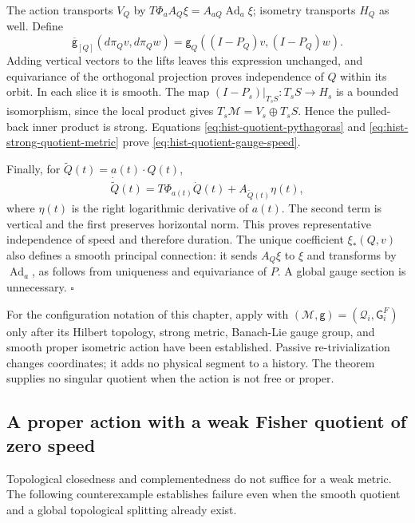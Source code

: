 The action transports \(V_Q\) by
\(T\Phi_a A_Q\xi=A_{aQ}\operatorname{Ad}_a\xi\); isometry transports
\(H_Q\) as well. Define
\begin{equation}
\overline{\mathsf g}_{[Q]}(d\pi_Qv,d\pi_Qw)
=\mathsf g_Q((I-P_Q)v,(I-P_Q)w).
\label{eq:hist-strong-quotient-metric}
\end{equation}
Adding vertical vectors to the lifts leaves this expression unchanged,
and equivariance of the orthogonal projection proves independence of \(Q\)
within its orbit. In each slice it is smooth. The map
\((I-P_s)|_{T_sS}:T_sS\to H_s\) is a bounded isomorphism, since the local
product gives \(T_s\mathcal M=V_s\oplus T_sS\). Hence the pulled-back inner
product is strong. Equations \eqref{eq:hist-quotient-pythagoras}
and \eqref{eq:hist-strong-quotient-metric} prove
\eqref{eq:hist-quotient-gauge-speed}.

Finally, for \(\widetilde Q(t)=a(t)\cdot Q(t)\),
\begin{equation}
\dot{\widetilde Q}(t)
=T\Phi_{a(t)}\dot Q(t)+A_{\widetilde Q(t)}\eta(t),
\label{eq:hist-moving-quotient-representative}
\end{equation}
where \(\eta(t)\) is the right logarithmic derivative of \(a(t)\).
The second term is vertical and the first preserves horizontal norm.
This proves representative independence of speed and therefore duration.
The unique coefficient \(\xi_*(Q,v)\) also defines a smooth principal
connection: it sends \(A_Q\xi\) to \(\xi\) and transforms by
\(\operatorname{Ad}_a\), as follows from uniqueness and equivariance of
\(P\). A global gauge section is unnecessary. \(\square\)

For the configuration notation of this chapter, apply
 with
\((\mathcal M,\mathsf g)=(\mathcal Q_i,\mathsf G_i^F)\) only after its
Hilbert topology, strong metric, Banach-Lie gauge group, and smooth proper
isometric action have been established. Passive re-trivialization changes
coordinates; it adds no physical segment to a history. The theorem supplies
no singular quotient when the action is not free or proper.

\subsection{A proper action with a weak Fisher quotient of zero speed}
\label{sec:hist-weak-fisher-quotient}

Topological closedness and complementedness do not suffice for a weak
metric. The following counterexample establishes failure even when the
smooth quotient and a global topological splitting already exist.

